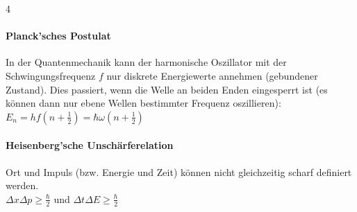 \documentclass[fs, footer]{latex4ei_custom}
\begin{document}
\begin{multicols*}{4}
{		\paragraph{Planck'sches Postulat} In der Quantenmechanik kann der harmonische Oszillator mit der Schwingungsfrequenz $f$ nur diskrete Energiewerte annehmen (gebundener Zustand).
		Dies passiert, wenn die Welle an beiden Enden eingesperrt ist (es können dann nur ebene Wellen bestimmter Frequenz oszillieren):\\
		$E_n = hf\left(n + \frac{1}{2}\right) = \hbar \omega \left(n + \frac{1}{2}\right)$
		\paragraph{Heisenberg'sche Unschärferelation} Ort und Impuls (bzw. Energie und Zeit) können nicht gleichzeitig scharf definiert werden.\\
		$\Delta x \Delta p \geq \frac{\hbar}{2}$ und $\Delta t \Delta E \geq \frac{\hbar}{2}$
	}

\end{multicols*}
\end{document}
